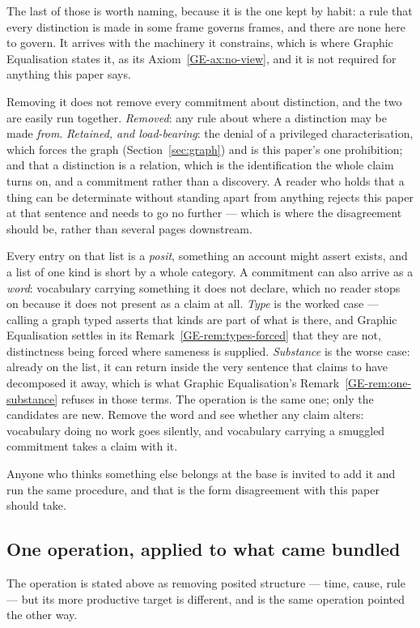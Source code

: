 \documentclass[11pt,a4paper]{article}
\begin{document}
The last of those is worth naming, because it is the one kept by habit: a rule that every distinction
is made in some frame governs frames, and there are none here to govern. It arrives with the machinery
it constrains, which is where Graphic Equalisation states it, as its Axiom~\ref{GE-ax:no-view}, and it
is not required for anything this paper says.

Removing it does not remove every commitment about distinction, and the two are easily run together.
\emph{Removed}: any rule about where a distinction may be made \emph{from}. \emph{Retained, and
load-bearing}: the denial of a privileged characterisation, which forces the graph
(Section~\ref{sec:graph}) and is this paper's one prohibition; and that a distinction is a relation, which is the identification the whole
claim turns on, and a commitment rather than a discovery. A reader who holds that a thing can be
determinate without standing apart from anything rejects this paper at that sentence and needs to go no
further --- which is where the disagreement should be, rather than several pages downstream.

Every entry on that list is a \emph{posit}, something an account might assert exists, and a list of one
kind is short by a whole category. A commitment can also arrive as a \emph{word}: vocabulary carrying
something it does not declare, which no reader stops on because it does not present as a claim at all.
\emph{Type} is the worked case --- calling a graph typed asserts that kinds are part of what is there,
and Graphic Equalisation settles in its Remark~\ref{GE-rem:types-forced} that they are not,
distinctness being forced where sameness is supplied.
\emph{Substance} is the worse case: already on the list, it can return inside the very sentence that
claims to have decomposed it away, which is what Graphic Equalisation's Remark~\ref{GE-rem:one-substance}
refuses in those terms. The operation is the same one; only the candidates are new. Remove the
word and see whether any claim alters: vocabulary doing no work goes silently, and vocabulary carrying
a smuggled commitment takes a claim with it.

Anyone who thinks something else belongs at the base is invited to add it and run the same procedure,
and that is the form disagreement with this paper should take.

\subsection*{One operation, applied to what came bundled}
The operation is stated above as removing posited structure --- time, cause, rule ---
but its more productive target is different, and is the same operation pointed the other way.
\end{document}
